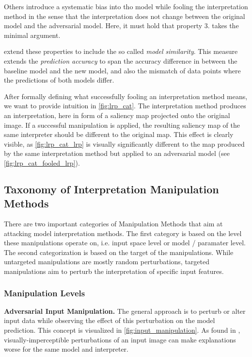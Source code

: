 Others introduce a systematic bias into tho model while fooling the interpretation method in the sense that the interpretation does not change between the original model and the adversarial model. 
Here, it must hold that property 3. takes the minimal argument.

\cite{dimanov2020you} extend these properties to include the so called \textit{model similarity}. This measure extends the \textit{prediction accuracy} to span the accuracy difference in between the baseline model and the new model, and also the mismatch of data points where the predictions of both models differ. 

After formally defining what successfully fooling an interpretation method means, we want to provide intuition in \autoref{fig:lrp_cat}. The interpretation method produces an interpretation, here in form of a saliency map projected onto the original image. If a successful manipulation is applied, the resulting saliency map of the same interpreter should be different to the original map. This effect is clearly visible, as \autoref{fig:lrp_cat_lrp} is visually significantly different to the map produced by the same interpretation method but applied to an adversarial model (see \autoref{fig:lrp_cat_fooled_lrp}). 

\subsection{Taxonomy of Interpretation Manipulation Methods}
\label{subsec:taxonomy_manipulations}
There are two important categories of Manipulation Methods that aim at attacking model interpretation methods. The first category is based on the level these manipulations operate on, i.e. input space level or model / paramater level. 
The second categorization is based on the target of the manipulations. While untargeted manipulations are mostly random perturbations, targeted manipulations aim to perturb the interpretation of specific input features. 

\subsubsection{Manipulation Levels}
\label{subsubsec:manipulation_levels}
\par\smallskip
\noindent 

\par\smallskip
\noindent\textbf{Adversarial Input Manipulation.} The general approach is to perturb or alter input data while observing the effect of this perturbation on the model prediction. This concept is visualized in \autoref{fig:input_manipulation}. 
As found in \cite{dombrowski2019explanations}, visually-imperceptible perturbations of an input image can make explanations worse for the same model and interpreter. 

